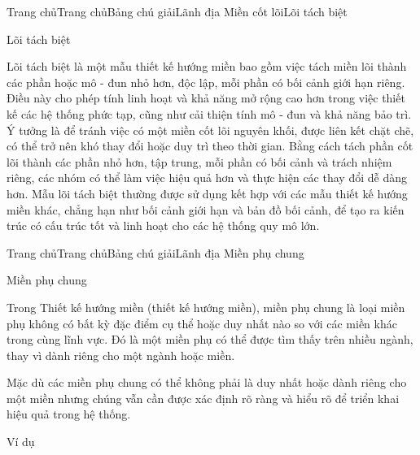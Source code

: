 
Trang chủTrang chủBảng chú giảiLãnh địa Miền cốt lõiLõi tách biệt

Lõi tách biệt

Lõi tách biệt là một mẫu thiết kế hướng miền bao gồm việc tách miền lõi thành các phần hoặc mô - đun nhỏ hơn, độc lập, mỗi phần có bối cảnh giới hạn riêng. Điều này cho phép tính linh hoạt và khả năng mở rộng cao hơn trong việc thiết kế các hệ thống phức tạp, cũng như cải thiện tính mô - đun và khả năng bảo trì. Ý tưởng là để tránh việc có một miền cốt lõi nguyên khối, được liên kết chặt chẽ, có thể trở nên khó thay đổi hoặc duy trì theo thời gian. Bằng cách tách phần cốt lõi thành các phần nhỏ hơn, tập trung, mỗi phần có bối cảnh và trách nhiệm riêng, các nhóm có thể làm việc hiệu quả hơn và thực hiện các thay đổi dễ dàng hơn. Mẫu lõi tách biệt thường được sử dụng kết hợp với các mẫu thiết kế hướng miền khác, chẳng hạn như bối cảnh giới hạn và bản đồ bối cảnh, để tạo ra kiến trúc có cấu trúc tốt và linh hoạt cho các hệ thống quy mô lớn.






Trang chủTrang chủBảng chú giảiLãnh địa Miền phụ chung

Miền phụ chung

Trong Thiết kế hướng miền (thiết kế hướng miền), miền phụ chung là loại miền phụ không có bất kỳ đặc điểm cụ thể hoặc duy nhất nào so với các miền khác trong cùng lĩnh vực. Đó là một miền phụ có thể được tìm thấy trên nhiều ngành, thay vì dành riêng cho một ngành hoặc miền.

Mặc dù các miền phụ chung có thể không phải là duy nhất hoặc dành riêng cho một miền nhưng chúng vẫn cần được xác định rõ ràng và hiểu rõ để triển khai hiệu quả trong hệ thống.

Ví dụ

